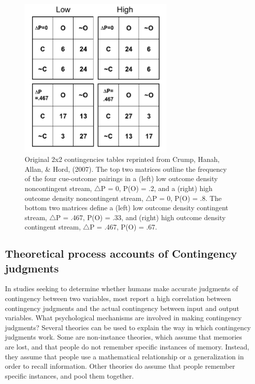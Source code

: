 \documentclass[
  english,
  man,floatsintext]{apa6}
\begin{document}
\begin{figure}

{\centering \includegraphics[width=3in]{imgs/crump_figure2_cropped} 

}

\caption{Original 2x2 contingencies tables reprinted from Crump, Hanah, Allan, \& Hord, (2007). The top two matrices outline the frequency of the four cue-outcome pairings in a (left) low outcome density noncontingent stream, $\triangle$P = 0, P(O) = .2, and a (right) high outcome density noncontingent stream, $\triangle$P = 0, P(O) = .8. The bottom two matrices define a (left) low outcome density contingent stream, $\triangle$P = .467, P(O) = .33, and (right) high outcome density contingent stream,  $\triangle$P = .467, P(O) = .67.}\label{fig:unnamed-chunk-1}
\end{figure}

\hypertarget{theoretical-process-accounts-of-contingency-judgments}{%
\subsection{Theoretical process accounts of Contingency judgments}\label{theoretical-process-accounts-of-contingency-judgments}}

In studies seeking to determine whether humans make accurate judgments of contingency between two variables, most report a high correlation between contingency judgments and the actual contingency between input and output variables. What psychological mechanisms are involved in making contingency judgments? Several theories can be used to explain the way in which contingency judgments work. Some are non-instance theories, which assume that memories are lost, and that people do not remember specific instances of memory. Instead, they assume that people use a mathematical relationship or a generalization in order to recall information. Other theories do assume that people remember specific instances, and pool them together.
\end{document}
